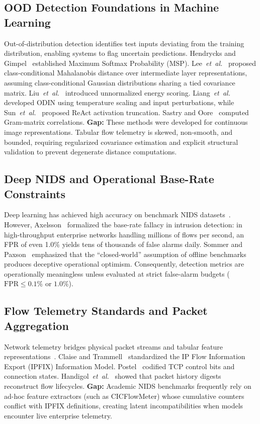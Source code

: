 \documentclass[journal]{IEEEtran}
\newcommand{\etal}{\emph{et~al.}}
\begin{document}
\subsection{OOD Detection Foundations in Machine Learning}
Out-of-distribution detection identifies test inputs deviating from the training distribution, enabling systems to flag uncertain predictions. Hendrycks and Gimpel~\cite{hendrycks2017baseline} established Maximum Softmax Probability (MSP). Lee~\etal~\cite{lee2018mahalanobis} proposed class-conditional Mahalanobis distance over intermediate layer representations, assuming class-conditional Gaussian distributions sharing a tied covariance matrix. Liu~\etal~\cite{liu2020energy} introduced unnormalized energy scoring. Liang~\etal~\cite{liang2018odin} developed ODIN using temperature scaling and input perturbations, while Sun~\etal~\cite{sun2021react} proposed ReAct activation truncation. Sastry and Oore~\cite{sastry2020gram} computed Gram-matrix correlations. 
\textbf{Gap:} These methods were developed for continuous image representations. Tabular flow telemetry is skewed, non-smooth, and bounded, requiring regularized covariance estimation and explicit structural validation to prevent degenerate distance computations.

\subsection{Deep NIDS and Operational Base-Rate Constraints}
Deep learning has achieved high accuracy on benchmark NIDS datasets~\cite{ahmad2021survey,bouidaine2025etasr,ferrag2023deeplearningNIDS,yang2022edgenids}. However, Axelsson~\cite{axelsson1999baserate} formalized the base-rate fallacy in intrusion detection: in high-throughput enterprise networks handling millions of flows per second, an FPR of even 1.0\% yields tens of thousands of false alarms daily. Sommer and Paxson~\cite{sommer2010outside} emphasized that the ``closed-world'' assumption of offline benchmarks produces deceptive operational optimism. Consequently, detection metrics are operationally meaningless unless evaluated at strict false-alarm budgets ($\text{FPR} \le 0.1\%$ or $1.0\%$).

\subsection{Flow Telemetry Standards and Packet Aggregation}
Network telemetry bridges physical packet streams and tabular feature representations~\cite{hofstede2014flowmonitoring}. Claise and Trammell~\cite{rfc7012} standardized the IP Flow Information Export (IPFIX) Information Model. Postel~\cite{rfc793} codified TCP control bits and connection states. Handigol~\etal~\cite{handigol2014netsight} showed that packet history digests reconstruct flow lifecycles.
\textbf{Gap:} Academic NIDS benchmarks frequently rely on ad-hoc feature extractors (such as CICFlowMeter) whose cumulative counters conflict with IPFIX definitions, creating latent incompatibilities when models encounter live enterprise telemetry.
\end{document}
